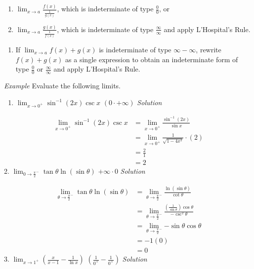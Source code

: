 \documentclass[
  letterpaper,
  DIV=11,
  numbers=noendperiod]{scrartcl}
\providecommand{\tightlist}{%
  \setlength{\itemsep}{0pt}\setlength{\parskip}{0pt}}\usepackage{longtable,booktabs,array}
\theoremstyle{plain}
\theoremstyle{remark}
\begin{document}
\begin{enumerate}
\def\labelenumi{(\alph{enumi})}
\tightlist
\item
  \(\displaystyle\lim_{x\to a}{\frac{f(x)}{\frac{1}{g(x)}}}\), which is
  indeterminate of type \(\frac{0}{0}\), or
\item
  \(\displaystyle\lim_{x\to a}{\frac{g(x)}{\frac{1}{f(x)}}}\), which is
  indeterminate of type \(\frac{\infty}{\infty}\) and apply L'Hospital's
  Rule.
\end{enumerate}

\begin{enumerate}
\def\labelenumi{\arabic{enumi}.}
\setcounter{enumi}{1}
\tightlist
\item
  If \(\displaystyle\lim_{x\to a}{f(x)+g(x)}\) is indeterminate of type
  \(\infty - \infty\), rewrite \(f(x)+g(x)\) as a single expression to
  obtain an indeterminate form of type \(\frac{0}{0}\) or
  \(\frac{\infty}{\infty}\) and apply L'Hospital's Rule.
\end{enumerate}

\leavevmode{}%
\emph{Example} Evaluate the following limits.

\begin{enumerate}
\def\labelenumi{\arabic{enumi}.}
\tightlist
\item
  \(\displaystyle\lim_{x\to 0^+}{\sin^{-1} (2x) \csc x}\)
  \((0\cdot +\infty)\) \emph{Solution}
\end{enumerate}

\[
\begin{aligned}
\displaystyle\lim_{x\to 0^+}{\sin^{-1} (2x) \csc x} &=\displaystyle\lim_{x\to 0^+}{\frac{\sin^{-1} (2x)}{\sin x}}\\&=\displaystyle\lim_{x\to 0^+}{\frac{1}{\sqrt{1-4x^2}}}\cdot (2) \\&=\frac{2}{1}\\&=2
\end{aligned}
\] 2.
\(\displaystyle\lim_{0\to \frac{\pi}{2}^-}{\tan \theta \ln (\sin \theta)}\)
\(+\infty \cdot 0\) \emph{Solution}

\[
\begin{aligned}
\displaystyle\lim_{\theta\to \frac{\pi}{2}^-}{\tan \theta \ln (\sin \theta)}&=\displaystyle\lim_{\theta \to \frac{\pi}{2}^-}{\frac {\ln (\sin \theta)}{\cot \theta}}\\&=\displaystyle\lim_{\theta\to \frac{\pi}{2}^-}{\frac{\left(\frac {1}{\sin \theta}\right)\cos \theta}{-\csc^2 \theta}}\\&=\displaystyle\lim_{\theta\to \frac{\pi}{2}^-}{-\sin \theta\cos \theta}\\&=-1(0)\\&=0
\end{aligned}
\] 3.
\(\displaystyle\lim_{x\to 1^+}{\left(\frac{x}{x-1}-\frac{1}{\ln x}\right)}\)
\(\left(\frac{1}{0^+}-\frac{1}{0^+}\right)\) \emph{Solution}
\end{document}
